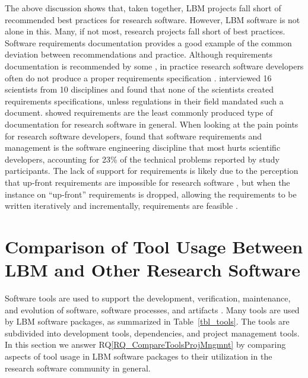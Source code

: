 \documentclass[final, 3p, times, authoryear]{elsarticle}
\newcommand{\rqref}[1]{RQ\ref{#1}}
\begin{document}
The above discussion shows that, taken together, LBM projects fall short of
recommended best practices for research software.  However, LBM software is not
alone in this.  Many, if not most, research projects fall short of best
practices.  Software requirements documentation provides a good example of the
common deviation between recommendations and practice.  Although requirements
documentation is recommended by some \citep{TobiasEtAl2018, HerouxEtAl2008,
SmithAndKoothoor2016}, in practice research software developers often do not
produce a proper requirements specification \citep{HeatonAndCarver2015}.
\citet{SandersAndKelly2008} interviewed 16 scientists from 10 disciplines and
found that none of the scientists created requirements specifications, unless
regulations in their field mandated such a document. \citet{Nguyen-HoanEtAl2010}
showed requirements are the least commonly produced type of documentation for
research software in general. When looking at the pain points for research
software developers, \citet{WieseEtAl2019} found that software requirements and
management is the software engineering discipline that most hurts scientific
developers, accounting for 23\% of the technical problems reported by study
participants.  The lack of support for requirements is likely due to the
perception that up-front requirements are impossible for research software
\citep{CarverEtAl2007,SegalAndMorris2008}, but when the instance on ``up-front''
requirements is dropped, allowing the requirements to be written iteratively and
incrementally, requirements are feasible \citep{Smith2016}.

\section{Comparison of Tool Usage Between LBM and Other Research Software}
\label{Sec_CompareTools}

Software tools are used to support the development, verification, maintenance,
and evolution of software, software processes, and artifacts \citep[p.\
501]{GhezziEtAl2003}. Many tools are used by LBM software packages, as
summarized in Table~\ref{tbl_tools}.  The tools are subdivided into development
tools, dependencies, and project management tools.  In this section we answer
\rqref{RQ_CompareToolsProjMngmnt} by comparing aspects of tool usage in LBM software packages to their utilization in the research software community in general.
\end{document}
